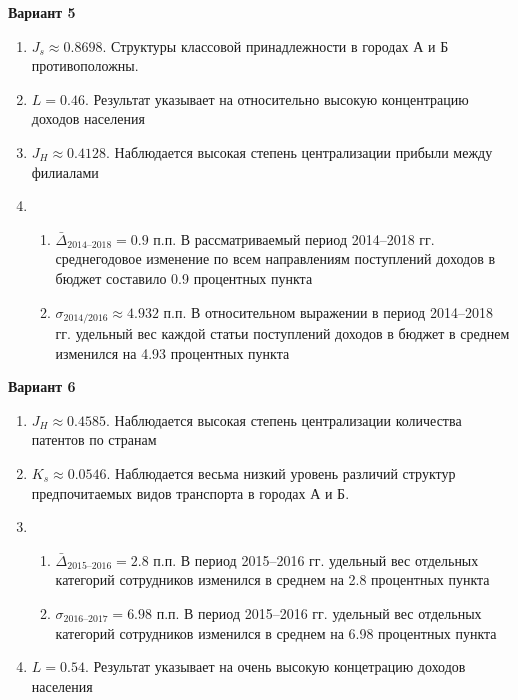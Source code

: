 \documentclass{article}
\begin{document}
\textbf{Вариант 5}
\begin{enumerate}
\item $J_s\approx 0.8698$. Структуры классовой принадлежности в городах А и Б противоположны.
\item $L= 0.46$. Результат указывает на относительно высокую концентрацию доходов населения
\item $J_H \approx 0.4128$. Наблюдается высокая степень централизации прибыли между филиалами
\item \begin{enumerate} \item $\bar\Delta_\text{2014--2018}= 0.9$ п.п. В рассматриваемый период 2014--2018 гг. среднегодовое изменение по всем направлениям поступлений доходов в бюджет составило 0.9 процентных пункта
\item $\sigma_\text{2014/2016}\approx 4.932$ п.п. В относительном выражении в период 2014--2018 гг. удельный вес каждой статьи поступлений доходов в бюджет в среднем изменился на 4.93 процентных пункта\end{enumerate}
\end{enumerate}

\textbf{Вариант 6}
\begin{enumerate}
\item $J_H \approx 0.4585$. Наблюдается высокая степень централизации количества патентов по странам
\item $K_s\approx 0.0546$. Наблюдается весьма низкий уровень различий структур предпочитаемых видов транспорта в городах А и Б.
\item \begin{enumerate} \item $\bar\Delta_\text{2015--2016}= 2.8$ п.п. В период 2015--2016 гг. удельный вес отдельных категорий сотрудников изменился в среднем на 2.8 процентных пункта
\item $\sigma_\text{2016--2017}= 6.98$ п.п. В период 2015--2016 гг. удельный вес отдельных категорий сотрудников изменился в среднем на 6.98 процентных пункта\end{enumerate}
\item $L= 0.54$. Результат указывает на очень высокую концетрацию доходов населения
\end{enumerate}
\end{document}
